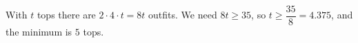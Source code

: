 With $t$ tops there are $2\cdot4\cdot t=8t$ outfits. We need $8t\ge35$, so $t\ge\dfrac{35}{8}=4.375$, and the minimum is $\boxed{5}$ tops.
